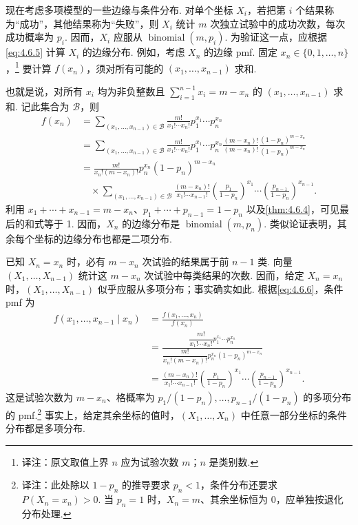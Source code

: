 现在考虑多项模型的一些边缘与条件分布. 对单个坐标 $X_i$，若把第 $i$ 个结果称为“成功”，其他结果称为“失败”，则 $X_i$ 统计 $m$ 次独立试验中的成功次数，每次成功概率为 $p_i$. 因而，$X_i$ 应服从 $\operatorname{binomial}(m,p_i)$. 为验证这一点，应根据\eqref{eq:4.6.5} 计算 $X_i$ 的边缘分布. 例如，考虑 $X_n$ 的边缘 pmf. 固定 $x_n\in\{0,1,\ldots,n\}$，\footnote{译注：原文取值上界 $n$ 应为试验次数 $m$；$n$ 是类别数.} 要计算 $f(x_n)$，须对所有可能的 $(x_1,\ldots,x_{n-1})$ 求和.

也就是说，对所有 $x_i$ 均为非负整数且 $\sum_{i=1}^{n-1}x_i=m-x_n$ 的 $(x_1,\ldots,x_{n-1})$ 求和. 记此集合为 $\mathscr B$，则
$$\begin{aligned}
f(x_n)&=\sum_{(x_1,\ldots,x_{n-1})\in\mathscr B}\frac{m!}{x_1!\cdots x_n!}p_1^{x_1}\cdots p_n^{x_n}\\
&=\sum_{(x_1,\ldots,x_{n-1})\in\mathscr B}\frac{m!}{x_1!\cdots x_n!}p_1^{x_1}\cdots p_n^{x_n}
\frac{(m-x_n)!}{(m-x_n)!}\frac{(1-p_n)^{m-x_n}}{(1-p_n)^{m-x_n}}\\
&=\frac{m!}{x_n!(m-x_n)!}p_n^{x_n}(1-p_n)^{m-x_n}\\
&\quad\times\sum_{(x_1,\ldots,x_{n-1})\in\mathscr B}\frac{(m-x_n)!}{x_1!\cdots x_{n-1}!}
\left(\frac{p_1}{1-p_n}\right)^{x_1}\cdots\left(\frac{p_{n-1}}{1-p_n}\right)^{x_{n-1}}.
\end{aligned}$$
利用 $x_1+\cdots+x_{n-1}=m-x_n$、$p_1+\cdots+p_{n-1}=1-p_n$ 以及\autoref{thm:4.6.4}，可见最后的和式等于 1. 因而，$X_n$ 的边缘分布是 $\operatorname{binomial}(m,p_n)$. 类似论证表明，其余每个坐标的边缘分布也都是二项分布.

已知 $X_n=x_n$ 时，必有 $m-x_n$ 次试验的结果属于前 $n-1$ 类. 向量 $(X_1,\ldots,X_{n-1})$ 统计这 $m-x_n$ 次试验中每类结果的次数. 因而，给定 $X_n=x_n$ 时，$(X_1,\ldots,X_{n-1})$ 似乎应服从多项分布；事实确实如此. 根据\eqref{eq:4.6.6}，条件 pmf 为
$$\begin{aligned}
f(x_1,\ldots,x_{n-1}\mid x_n)&=\frac{f(x_1,\ldots,x_n)}{f(x_n)}\\
&=\frac{\dfrac{m!}{x_1!\cdots x_n!}p_1^{x_1}\cdots p_n^{x_n}}
{\dfrac{m!}{x_n!(m-x_n)!}p_n^{x_n}(1-p_n)^{m-x_n}}\\
&=\frac{(m-x_n)!}{x_1!\cdots x_{n-1}!}\left(\frac{p_1}{1-p_n}\right)^{x_1}\cdots\left(\frac{p_{n-1}}{1-p_n}\right)^{x_{n-1}}.
\end{aligned}$$
这是试验次数为 $m-x_n$、格概率为 $p_1/(1-p_n),\ldots,p_{n-1}/(1-p_n)$ 的多项分布的 pmf.\footnote{译注：此处除以 $1-p_n$ 的推导要求 $p_n<1$，条件分布还要求 $P(X_n=x_n)>0$. 当 $p_n=1$ 时，$X_n=m$、其余坐标恒为 0，应单独按退化分布处理.} 事实上，给定其余坐标的值时，$(X_1,\ldots,X_n)$ 中任意一部分坐标的条件分布都是多项分布.


